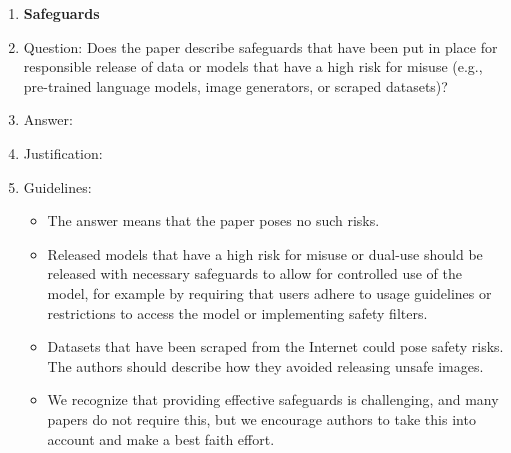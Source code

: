 \documentclass{article}
\begin{document}
\begin{enumerate}
\item {\bf Safeguards}
    \item[] Question: Does the paper describe safeguards that have been put in place for responsible release of data or models that have a high risk for misuse (e.g., pre-trained language models, image generators, or scraped datasets)?
    \item[] Answer: \answerTODO{} %
    \item[] Justification: \justificationTODO{}
    \item[] Guidelines:
    \begin{itemize}
        \item The answer \answerNA{} means that the paper poses no such risks.
        \item Released models that have a high risk for misuse or dual-use should be released with necessary safeguards to allow for controlled use of the model, for example by requiring that users adhere to usage guidelines or restrictions to access the model or implementing safety filters. 
        \item Datasets that have been scraped from the Internet could pose safety risks. The authors should describe how they avoided releasing unsafe images.
        \item We recognize that providing effective safeguards is challenging, and many papers do not require this, but we encourage authors to take this into account and make a best faith effort.
    \end{itemize}


\end{enumerate}
\end{document}
